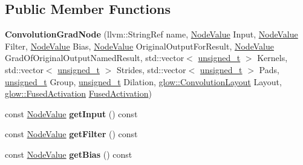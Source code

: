 \subsection*{Public Member Functions}
\begin{DoxyCompactItemize}
\item 
\mbox{\label{classglow_1_1_convolution_grad_node_a65811624b82e512861584a4cfd22a1bd}} 
{\bfseries Convolution\+Grad\+Node} (llvm\+::\+String\+Ref name, \hyperlink{structglow_1_1_node_value}{Node\+Value} Input, \hyperlink{structglow_1_1_node_value}{Node\+Value} Filter, \hyperlink{structglow_1_1_node_value}{Node\+Value} Bias, \hyperlink{structglow_1_1_node_value}{Node\+Value} Original\+Output\+For\+Result, \hyperlink{structglow_1_1_node_value}{Node\+Value} Grad\+Of\+Original\+Output\+Named\+Result, std\+::vector$<$ \hyperlink{namespaceglow_a0ca574644e1e42ef193a9947fb4d8911}{unsigned\+\_\+t} $>$ Kernels, std\+::vector$<$ \hyperlink{namespaceglow_a0ca574644e1e42ef193a9947fb4d8911}{unsigned\+\_\+t} $>$ Strides, std\+::vector$<$ \hyperlink{namespaceglow_a0ca574644e1e42ef193a9947fb4d8911}{unsigned\+\_\+t} $>$ Pads, \hyperlink{namespaceglow_a0ca574644e1e42ef193a9947fb4d8911}{unsigned\+\_\+t} Group, \hyperlink{namespaceglow_a0ca574644e1e42ef193a9947fb4d8911}{unsigned\+\_\+t} Dilation, \hyperlink{namespaceglow_aa2f3a33e05699df0f42295c5c4bd1f77}{glow\+::\+Convolution\+Layout} Layout, \hyperlink{namespaceglow_ae88f2cc9ccac93130ee1cc326d968a21}{glow\+::\+Fused\+Activation} \hyperlink{namespaceglow_ae88f2cc9ccac93130ee1cc326d968a21}{Fused\+Activation})
\item 
\mbox{\label{classglow_1_1_convolution_grad_node_a10be8e9430ebe4ad694e05ad7e932196}} 
const \hyperlink{structglow_1_1_node_value}{Node\+Value} {\bfseries get\+Input} () const
\item 
\mbox{\label{classglow_1_1_convolution_grad_node_a9341d3400994d91cee3358d90cca2eb1}} 
const \hyperlink{structglow_1_1_node_value}{Node\+Value} {\bfseries get\+Filter} () const
\item 
\mbox{\label{classglow_1_1_convolution_grad_node_aeb8d1ea4ac0557a1c1e80467e66a6685}} 
const \hyperlink{structglow_1_1_node_value}{Node\+Value} {\bfseries get\+Bias} () const
\item 

\end{DoxyCompactItemize}
